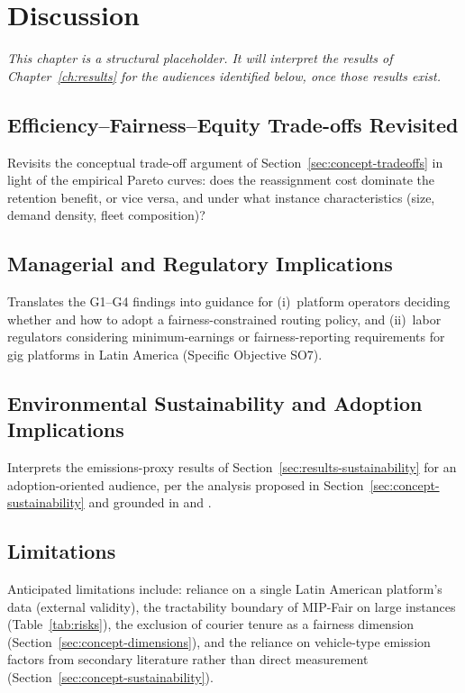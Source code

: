 \documentclass[12pt,a4paper]{report}
\begin{document}
\chapter{Discussion}
\label{ch:discussion}

\begingroup\small\noindent\textit{This chapter is a structural placeholder. It will interpret the results of Chapter~\ref{ch:results} for the audiences identified below, once those results exist.}\endgroup

\section{Efficiency--Fairness--Equity Trade-offs Revisited}
Revisits the conceptual trade-off argument of Section~\ref{sec:concept-tradeoffs} in light of the empirical Pareto curves: does the reassignment cost dominate the retention benefit, or vice versa, and under what instance characteristics (size, demand density, fleet composition)?

\section{Managerial and Regulatory Implications}
Translates the G1--G4 findings into guidance for (i)~platform operators deciding whether and how to adopt a fairness-constrained routing policy, and (ii)~labor regulators considering minimum-earnings or fairness-reporting requirements for gig platforms in Latin America (Specific Objective SO7).

\section{Environmental Sustainability and Adoption Implications}
Interprets the emissions-proxy results of Section~\ref{sec:results-sustainability} for an adoption-oriented audience, per the analysis proposed in Section~\ref{sec:concept-sustainability} and grounded in \citet{moradi2025systematic} and \citet{bajec2022strategic}.

\section{Limitations}
Anticipated limitations include: reliance on a single Latin American platform's data (external validity), the tractability boundary of MIP-Fair on large instances (Table~\ref{tab:risks}), the exclusion of courier tenure as a fairness dimension (Section~\ref{sec:concept-dimensions}), and the reliance on vehicle-type emission factors from secondary literature rather than direct measurement (Section~\ref{sec:concept-sustainability}).
\end{document}
